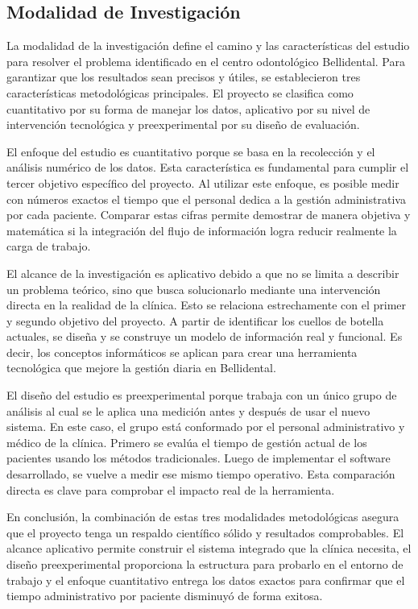 \subsection{Modalidad de Investigación}

La modalidad de la investigación define el camino y las características del estudio para resolver el problema identificado en el centro odontológico Bellidental. Para garantizar que los resultados sean precisos y útiles, se establecieron tres características metodológicas principales. El proyecto se clasifica como cuantitativo por su forma de manejar los datos, aplicativo por su nivel de intervención tecnológica y preexperimental por su diseño de evaluación.

El enfoque del estudio es cuantitativo porque se basa en la recolección y el análisis numérico de los datos. Esta característica es fundamental para cumplir el tercer objetivo específico del proyecto. Al utilizar este enfoque, es posible medir con números exactos el tiempo que el personal dedica a la gestión administrativa por cada paciente. Comparar estas cifras permite demostrar de manera objetiva y matemática si la integración del flujo de información logra reducir realmente la carga de trabajo.

El alcance de la investigación es aplicativo debido a que no se limita a describir un problema teórico, sino que busca solucionarlo mediante una intervención directa en la realidad de la clínica. Esto se relaciona estrechamente con el primer y segundo objetivo del proyecto. A partir de identificar los cuellos de botella actuales, se diseña y se construye un modelo de información real y funcional. Es decir, los conceptos informáticos se aplican para crear una herramienta tecnológica que mejore la gestión diaria en Bellidental.

El diseño del estudio es preexperimental porque trabaja con un único grupo de análisis al cual se le aplica una medición antes y después de usar el nuevo sistema. En este caso, el grupo está conformado por el personal administrativo y médico de la clínica. Primero se evalúa el tiempo de gestión actual de los pacientes usando los métodos tradicionales. Luego de implementar el software desarrollado, se vuelve a medir ese mismo tiempo operativo. Esta comparación directa es clave para comprobar el impacto real de la herramienta.

En conclusión, la combinación de estas tres modalidades metodológicas asegura que el proyecto tenga un respaldo científico sólido y resultados comprobables. El alcance aplicativo permite construir el sistema integrado que la clínica necesita, el diseño preexperimental proporciona la estructura para probarlo en el entorno de trabajo y el enfoque cuantitativo entrega los datos exactos para confirmar que el tiempo administrativo por paciente disminuyó de forma exitosa.